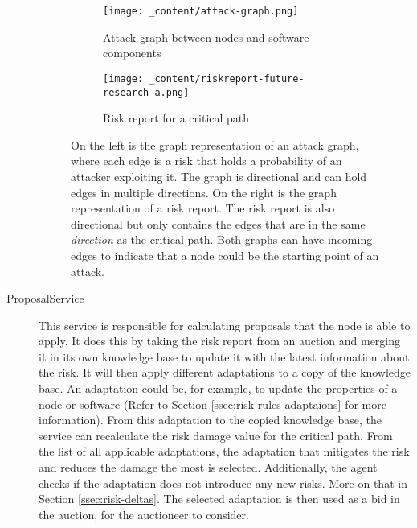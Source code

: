 \begin{description}
    \begin{figure}[H]
        \label{fig:attack-graph-to-risk-report}
        \centering
        \begin{subfigure}[b]{0.4\textwidth}
            \centering
            \texttt{[image: \_content/attack-graph.png]}
            \caption{Attack graph between nodes and software components}
            \label{fig:attack-graph}
        \end{subfigure}
        \hspace{0.5cm}
        \centering
        \begin{subfigure}[b]{0.4\textwidth}
            \centering
            \texttt{[image: \_content/riskreport-future-research-a.png]}
            \caption{Risk report for a critical path}
            \label{fig:risk-report}
        \end{subfigure}
        \caption{On the left is the graph representation of an attack graph, where each edge is a risk that holds a probability of an attacker exploiting it. The graph is directional and can hold edges in multiple directions. On the right is the graph representation of a risk report. The risk report is also directional but only contains the edges that are in the same \textit{direction} as the critical path. Both graphs can have incoming edges to indicate that a node could be the starting point of an attack.}
    \end{figure}



    \item[ProposalService] This service is responsible for calculating proposals that the node is able to apply. It does this by taking the risk report from an auction and merging it in its own knowledge base to update it with the latest information about the risk. It will then apply different adaptations to a copy of the knowledge base. An adaptation could be, for example, to update the properties of a node or software (Refer to Section \ref{ssec:risk-rules-adaptaions} for more information). From this adaptation to the copied knowledge base, the service can recalculate the risk damage value for the critical path. From the list of all applicable adaptations, the adaptation that mitigates the risk and reduces the damage the most is selected. Additionally, the agent checks if the adaptation does not introduce any new risks. More on that in Section \ref{ssec:risk-deltas}. The selected adaptation is then used as a bid in the auction, for the auctioneer to consider. 
    

\end{description}
